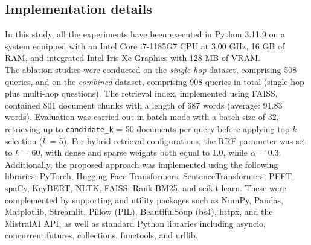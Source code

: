 \documentclass[a4paper,12pt, openany]{book}  %
\begin{document}
\frontmatter
\pagestyle{fancy}
\tableofcontents


\clearpage

\clearpage
\listoffigures
\clearpage
\listoftables
\clearpage
\lstlistoflistings
\clearpage

\newpage
\thispagestyle{empty} 
\mbox{}                

\mainmatter
\pagestyle{fancy}
\renewcommand{\figureautorefname}{Fig.}
\renewcommand{\tableautorefname}{Tab.}
\renewcommand{\chapterautorefname}{Chap.}
\renewcommand{\sectionautorefname}{Sec.}
\renewcommand{\subsectionautorefname}{Sec.}
\makeatletter
\renewcommand{\thefootnote}{\textsuperscript{\arabic{footnote}}}
\renewcommand\@makefntext[1]{%
  \noindent
  \parindent=0pt
  \leftskip=0pt
  \hb@xt@1.8em{\hss\@thefnmark}#1%
}
\makeatother










\clearpage
\begin{appendices}
    \chapter{Implementation details}
    \label{appendix:A}

In this study, all the experiments have been executed in Python 3.11.9 on a system equipped with an Intel Core i7-1185G7 CPU at 3.00 GHz, 16 GB of RAM, and integrated Intel Iris Xe Graphics with 128 MB of VRAM.\\ 


\noindent The ablation studies were conducted on the \textit{single-hop} dataset, comprising 508 queries, and on the \textit{combined} dataset, comprising 908 queries in total (single-hop plus multi-hop questions). The retrieval index, implemented using FAISS, contained 801 document chunks with a length of 687 words (average: 91.83 words). Evaluation was carried out in batch mode with a batch size of 32, retrieving up to \texttt{candidate\_k} = 50 documents per query before applying top-$k$ selection ($k$ = 5). For hybrid retrieval configurations, the RRF parameter was set to $k$ = 60, with dense and sparse weights both equal to 1.0, while $\alpha$ = 0.3.\\

\noindent Additionally, the proposed approach was implemented using the following libraries: PyTorch, Hugging Face Transformers, SentenceTransformers, PEFT, spaCy, KeyBERT, NLTK, FAISS, Rank-BM25, and scikit-learn. These were complemented by supporting and utility packages such as NumPy, Pandas, Matplotlib, Streamlit, Pillow (PIL), BeautifulSoup (bs4), httpx, and the MistralAI API, as well as standard Python libraries including asyncio, concurrent.futures, collections, functools, and urllib.




\end{appendices}

\sloppy
\backmatter
\pagestyle{fancy}

{}
\printbibliography
\end{document}
